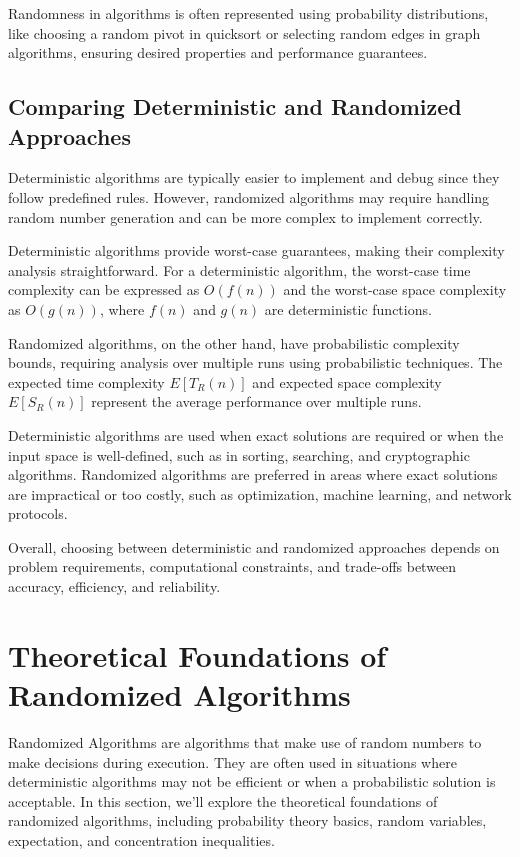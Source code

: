 \documentclass[12pt]{book} %
\begin{document}
Randomness in algorithms is often represented using probability distributions, like choosing a random pivot in quicksort or selecting random edges in graph algorithms, ensuring desired properties and performance guarantees.

\subsection{Comparing Deterministic and Randomized Approaches}

Deterministic algorithms are typically easier to implement and debug since they follow predefined rules. However, randomized algorithms may require handling random number generation and can be more complex to implement correctly.

Deterministic algorithms provide worst-case guarantees, making their complexity analysis straightforward. For a deterministic algorithm, the worst-case time complexity can be expressed as \(O(f(n))\) and the worst-case space complexity as \(O(g(n))\), where \(f(n)\) and \(g(n)\) are deterministic functions.

Randomized algorithms, on the other hand, have probabilistic complexity bounds, requiring analysis over multiple runs using probabilistic techniques. The expected time complexity \(E[T_R(n)]\) and expected space complexity \(E[S_R(n)]\) represent the average performance over multiple runs.

Deterministic algorithms are used when exact solutions are required or when the input space is well-defined, such as in sorting, searching, and cryptographic algorithms. Randomized algorithms are preferred in areas where exact solutions are impractical or too costly, such as optimization, machine learning, and network protocols.

Overall, choosing between deterministic and randomized approaches depends on problem requirements, computational constraints, and trade-offs between accuracy, efficiency, and reliability.



\section{Theoretical Foundations of Randomized Algorithms}

Randomized Algorithms are algorithms that make use of random numbers to make decisions during execution. They are often used in situations where deterministic algorithms may not be efficient or when a probabilistic solution is acceptable. In this section, we'll explore the theoretical foundations of randomized algorithms, including probability theory basics, random variables, expectation, and concentration inequalities.
\end{document}
